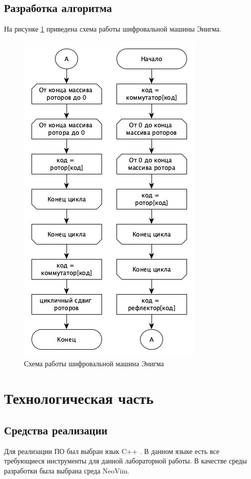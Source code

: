 \subsection{Разработка алгоритма}

На рисунке \ref{fig:alg} приведена схема работы шифровальной машины Энигма.


\begin{figure}[ht!]
	\centering
	\includegraphics[width=0.6\linewidth]{assets/graphs/enigma-algo.png}
	\caption{Схема работы шифровальной машина Энигма}
	\label{fig:alg}
\end{figure}

\clearpage

\section{Технологическая часть}

\subsection{Средства реализации}

Для реализации ПО был выбран язык C++ \cite{c++}.
В данном языке есть все требующиеся инструменты для данной лабораторной работы.
В качестве среды разработки была выбрана среда NeoVim\cite{nvim}.

